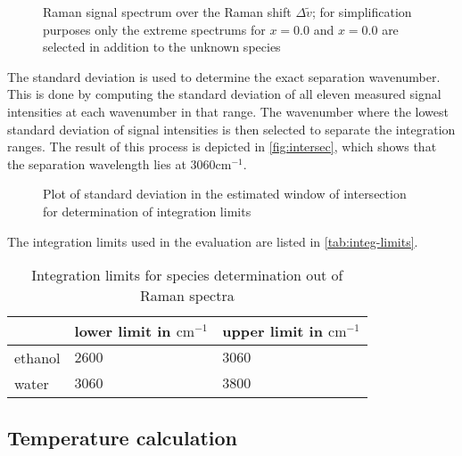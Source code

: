 \begin{figure}[!htb]
    \centering
    
    \caption[Plot of Raman signal spectra over Raman shift]{Raman signal spectrum over the Raman shift $\Delta \tilde{v}$; for simplification purposes only the extreme spectrums for $x=0.0$ and $x=0.0$ are selected in addition to the unknown species}
    \label{fig:spectra}
\end{figure}

The standard deviation is used to determine the exact separation wavenumber. This is done by computing the standard deviation of all eleven measured signal intensities at each wavenumber in that range. The wavenumber where the lowest standard deviation of signal intensities is then selected to separate the integration ranges. The result of this process is depicted in \autoref{fig:intersec}, which shows that the separation wavelength lies at $3060 \mathrm{cm^{-1}}$.

\begin{figure}[!htb]
    \centering
    
    \caption[Determination of the species spectra intersection point]{Plot of standard deviation in the estimated window of intersection for determination of integration limits}
    \label{fig:intersec}
\end{figure}

The integration limits used in the evaluation are listed in \autoref{tab:integ-limits}.

\begin{table}[!htb]
    \centering
    \caption{Integration limits for species determination out of Raman spectra}
    \label{tab:integ-limits}
    \vspace{12pt}
    \begin{tabular}{|l|l|l|}
        \cline{2-3}
        \multicolumn{1}{l|}{} & lower limit in $\mathrm{cm^{-1}}$ & upper limit in $\mathrm{cm^{-1}}$ \\ \hline
        ethanol & $2600$ & $3060$ \\ \hline
        water & $3060$ & $3800$ \\ \hline
    \end{tabular}
\end{table}

\subsection*{Temperature calculation}
\label{subsec:temp-prep}

